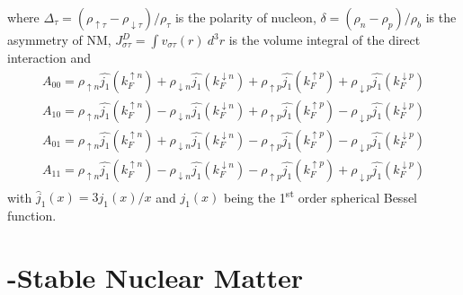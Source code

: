 where $\Delta_{\tau} = (\rho_{\uparrow \tau} - \rho_{\downarrow \tau})/\rho_{\tau}$ is the polarity of nucleon, $\delta = (\rho_n - \rho_p)/\rho_b$ is the asymmetry of \gls{NM}, $J^D_{\sigma\tau} = \int v_{\sigma\tau}(r)\: d^3 r$ is the volume integral of the direct interaction and
\begin{equation}
        \begin{array}{l}
                A_{00} = \rho_{\uparrow n} \hat{j_1}(k_F^{\uparrow n}) + \rho_{\downarrow n} \hat{j_1}(k_F^{\downarrow n}) + \rho_{\uparrow p} \hat{j_1}(k_F^{\uparrow p}) + \rho_{\downarrow p} \hat{j_1}(k_F^{\downarrow p})\\[5pt]
                A_{10} = \rho_{\uparrow n} \hat{j_1}(k_F^{\uparrow n}) - \rho_{\downarrow n} \hat{j_1}(k_F^{\downarrow n}) + \rho_{\uparrow p} \hat{j_1}(k_F^{\uparrow p}) - \rho_{\downarrow p} \hat{j_1}(k_F^{\downarrow p})\\[5pt]
                A_{01} = \rho_{\uparrow n} \hat{j_1}(k_F^{\uparrow n}) + \rho_{\downarrow n} \hat{j_1}(k_F^{\downarrow n}) - \rho_{\uparrow p} \hat{j_1}(k_F^{\uparrow p}) - \rho_{\downarrow p} \hat{j_1}(k_F^{\downarrow p})\\[5pt]
                A_{11} = \rho_{\uparrow n} \hat{j_1}(k_F^{\uparrow n}) - \rho_{\downarrow n} \hat{j_1}(k_F^{\downarrow n}) - \rho_{\uparrow p} \hat{j_1}(k_F^{\uparrow p}) + \rho_{\downarrow p} \hat{j_1}(k_F^{\downarrow p})
        \end{array}
\end{equation}
with $\hat{j}_1(x)=3j_1(x)/x$ and $j_1(x)$ being the 1\textsuperscript{st} order spherical Bessel function.

\section{\textbeta-Stable Nuclear Matter}%
\label{sec:textbeta_stable_nuclear_matter}

